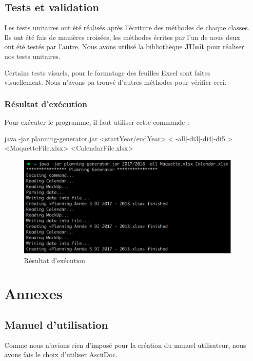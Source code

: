\documentclass{polytech/polytech}
\begin{document}
	\section{Tests et validation}

	Les tests unitaires ont été réalisés après l'écriture des méthodes de chaque classes.
	Ils ont été fais de manières croisées, les méthodes écrites par l'un de nous deux ont été testés par l'autre.
	Nous avons utilisé la bibliothèque \textbf{JUnit} pour réaliser nos tests unitaires.

	Certains tests visuels, pour le formatage des feuilles Excel sont faites visuellement.
	Nous n'avons pa trouvé d'autres méthodes pour vérifier ceci.

	\subsection{Résultat d'exécution}

	Pour exécuter le programme, il faut utiliser cette commande :

	\begin{latexsource}
	java -jar planning-generator.jar <startYear/endYear> < -all|-di3|-di4|-di5 > <MaquetteFile.xlsx> <CalendarFile.xlsx>
	\end{latexsource}

	\begin{figure}
		\caption{Résultat d'exécution}
		\includegraphics[width=15cm]{./img/excution_result2.png}
	\end{figure}


	\chapter{Annexes}

	\section{Manuel d'utilisation}
	Comme nous n'avions rien d'imposé pour la création du manuel utilisateur, nous avons fais le choix d'utiliser AsciiDoc.

	
\end{document}
